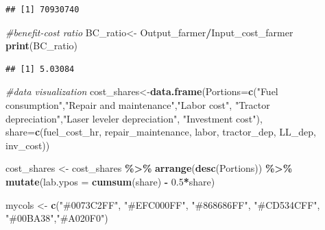 \documentclass[
]{article}
\newenvironment{Shaded}{\begin{snugshade}}{\end{snugshade}}
\newcommand{\AttributeTok}[1]{\textcolor[rgb]{0.13,0.29,0.53}{#1}}
\newcommand{\CommentTok}[1]{\textcolor[rgb]{0.56,0.35,0.01}{\textit{#1}}}
\newcommand{\FloatTok}[1]{\textcolor[rgb]{0.00,0.00,0.81}{#1}}
\newcommand{\FunctionTok}[1]{\textcolor[rgb]{0.13,0.29,0.53}{\textbf{#1}}}
\newcommand{\NormalTok}[1]{#1}
\newcommand{\OtherTok}[1]{\textcolor[rgb]{0.56,0.35,0.01}{#1}}
\newcommand{\SpecialCharTok}[1]{\textcolor[rgb]{0.81,0.36,0.00}{\textbf{#1}}}
\newcommand{\StringTok}[1]{\textcolor[rgb]{0.31,0.60,0.02}{#1}}
\begin{document}
\begin{verbatim}
## [1] 70930740
\end{verbatim}

\begin{Shaded}
\begin{Highlighting}[]
\CommentTok{\#benefit{-}cost ratio}
\NormalTok{BC\_ratio}\OtherTok{\textless{}{-}}\NormalTok{ Output\_farmer}\SpecialCharTok{/}\NormalTok{Input\_cost\_farmer}
\FunctionTok{print}\NormalTok{(BC\_ratio)}
\end{Highlighting}
\end{Shaded}

\begin{verbatim}
## [1] 5.03084
\end{verbatim}

\begin{Shaded}
\begin{Highlighting}[]
\CommentTok{\#data visualization}
\NormalTok{cost\_shares}\OtherTok{\textless{}{-}}\FunctionTok{data.frame}\NormalTok{(}\AttributeTok{Portions=}\FunctionTok{c}\NormalTok{(}\StringTok{"Fuel consumption"}\NormalTok{,}\StringTok{"Repair and maintenance"}\NormalTok{,}\StringTok{"Labor cost"}\NormalTok{, }\StringTok{"Tractor depreciation"}\NormalTok{,}\StringTok{"Laser leveler depreciation"}\NormalTok{, }\StringTok{"Investment cost"}\NormalTok{), }\AttributeTok{share=}\FunctionTok{c}\NormalTok{(fuel\_cost\_hr, repair\_maintenance, labor, tractor\_dep, LL\_dep, inv\_cost))}


\NormalTok{cost\_shares }\OtherTok{\textless{}{-}}\NormalTok{ cost\_shares }\SpecialCharTok{\%\textgreater{}\%}
  \FunctionTok{arrange}\NormalTok{(}\FunctionTok{desc}\NormalTok{(Portions)) }\SpecialCharTok{\%\textgreater{}\%}
  \FunctionTok{mutate}\NormalTok{(}\AttributeTok{lab.ypos =} \FunctionTok{cumsum}\NormalTok{(share) }\SpecialCharTok{{-}} \FloatTok{0.5}\SpecialCharTok{*}\NormalTok{share)}

\NormalTok{mycols }\OtherTok{\textless{}{-}} \FunctionTok{c}\NormalTok{(}\StringTok{"\#0073C2FF"}\NormalTok{, }\StringTok{"\#EFC000FF"}\NormalTok{, }\StringTok{"\#868686FF"}\NormalTok{, }\StringTok{"\#CD534CFF"}\NormalTok{, }\StringTok{"\#00BA38"}\NormalTok{,}\StringTok{"\#A020F0"}\NormalTok{)}


\end{Highlighting}
\end{Shaded}
\end{document}
